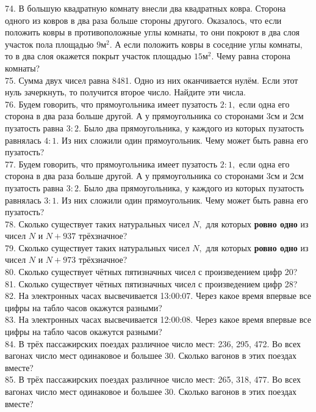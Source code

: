 74. В большую квадратную комнату внесли два квадратных ковра. Сторона одного из ковров в два раза больше стороны другого. Оказалось, что если положить ковры в противоположные углы комнаты, то они покроют в два слоя участок пола площадью $9\text{м}^2.$ А если положить ковры в соседние углы комнаты, то в два слоя окажется покрыт участок площадью $15\text{м}^2.$ Чему равна сторона комнаты?\\
75. Сумма двух чисел равна 8481. Одно из них оканчивается нулём. Если этот нуль зачеркнуть, то получится второе число. Найдите эти числа.\\
76. Будем говорить, что прямоугольника имеет пузатость $2:1,$ если одна его сторона в два раза больше другой. А у прямоугольника со сторонами 3см и 2см пузатость равна $3:2.$ Было два прямоугольника, у каждого из которых пузатость равнялась $4:1.$ Из них сложили один прямоугольник. Чему может быть равна его пузатость?\\
77. Будем говорить, что прямоугольника имеет пузатость $2:1,$ если одна его сторона в два раза больше другой. А у прямоугольника со сторонами 3см и 2см пузатость равна $3:2.$ Было два прямоугольника, у каждого из которых пузатость равнялась $3:1.$ Из них сложили один прямоугольник. Чему может быть равна его пузатость?\\
78. Сколько существует таких натуральных чисел $N,$ для которых {\bf ровно одно} из чисел $N$ и $N+937$ трёхзначное?\\
79. Сколько существует таких натуральных чисел $N,$ для которых {\bf ровно одно} из чисел $N$ и $N+973$ трёхзначное?\\
80. Сколько существует чётных пятизначных чисел с произведением цифр 20?\\
81. Сколько существует чётных пятизначных чисел с произведением цифр 28?\\
82. На электронных часах высвечивается 13:00:07. Через какое время впервые все цифры на табло часов окажутся разными?\\
83. На электронных часах высвечивается 12:00:08. Через какое время впервые все цифры на табло часов окажутся разными?\\
84. В трёх пассажирских поездах различное число мест: 236, 295, 472. Во всех вагонах число мест одинаковое и большее 30. Сколько вагонов в этих поездах вместе?\\
85. В трёх пассажирских поездах различное число мест: 265, 318, 477. Во всех вагонах число мест одинаковое и большее 30. Сколько вагонов в этих поездах вместе?\\
